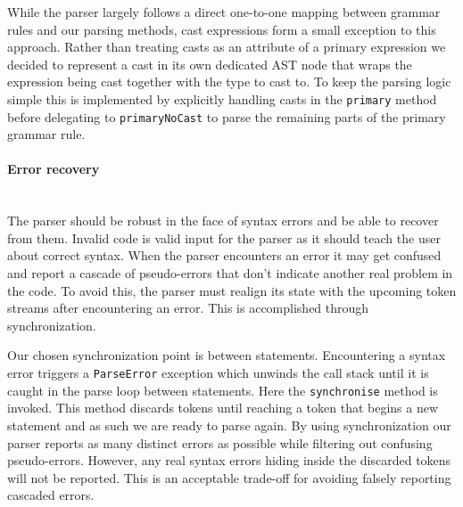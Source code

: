 While the parser largely follows a direct one-to-one mapping between grammar rules and our parsing methods, 
cast expressions form a small exception to this approach.
Rather than treating casts as an attribute of a primary expression we decided to represent a cast
in its own dedicated AST node that wraps the expression being cast together with the type to cast to.
To keep the parsing logic simple this is implemented by explicitly handling casts in the \texttt{primary} method before delegating
to \texttt{primaryNoCast} to parse the remaining parts of the primary grammar rule.

\paragraph{Error recovery}\mbox{}\\
The parser should be robust in the face of syntax errors and be able to recover from them.
Invalid code is valid input for the parser as it should teach the user about correct syntax.
When the parser encounters an error it may get confused and report a cascade of
pseudo-errors that don't indicate another real problem in the code.
To avoid this, the parser must realign its state with the upcoming token streams after encountering an error.
This is accomplished through synchronization.

Our chosen synchronization point is between statements. Encountering a syntax error
triggers a \texttt{ParseError} exception which unwinds the call stack until it is caught in the parse
loop between statements. Here the \texttt{synchronise} method is invoked.
This method discards tokens until reaching a token that begins a new statement and as such we are ready to parse again.
By using synchronization our parser reports as many distinct errors as possible while filtering out confusing pseudo-errors.
However, any real syntax errors hiding inside the discarded tokens will not be reported. This is an acceptable
trade-off for avoiding falsely reporting cascaded errors.


